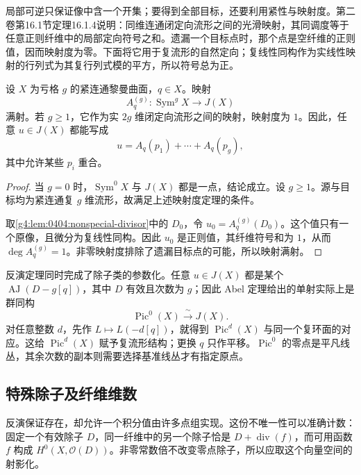 局部可逆只保证像中含一个开集；要得到全部目标，还要利用紧性与映射度。第二卷第16.1节定理16.1.4说明：同维连通闭定向流形之间的光滑映射，其同调度等于任意正则纤维中的局部定向符号之和。遗漏一个目标点时，那个点是空纤维的正则值，因而映射度为零。下面将它用于复流形的自然定向；复线性同构作为实线性映射的行列式为其复行列式模的平方，所以符号总为正。

\begin{theorem}[Jacobi 反演]
	\label{g4:thm:0404:jacobi-inversion}
	设 \(X\) 为亏格 \(g\) 的紧连通黎曼曲面，\(q\in X\)。映射
	\[
		A_q^{(g)}:\operatorname{Sym}^gX\longrightarrow J(X)
	\]
	满射。若 \(g\ge1\)，它作为实 \(2g\) 维闭定向流形之间的映射，映射度为 \(1\)。因此，任意 \(u\in J(X)\) 都能写成
	\[
		u=A_q(p_1)+\cdots+A_q(p_g),
	\]
	其中允许某些 \(p_i\) 重合。
\end{theorem}
\begin{proof}
	当 \(g=0\) 时，\(\operatorname{Sym}^0X\) 与 \(J(X)\) 都是一点，结论成立。设 \(g\ge1\)。源与目标均为紧连通复 \(g\) 维流形，故满足上述映射度定理的条件。

	取\cref{g4:lem:0404:nonspecial-divisor}中的 \(D_0\)，令 \(u_0=A_q^{(g)}(D_0)\)。这个值只有一个原像，且微分为复线性同构。因此 \(u_0\) 是正则值，其纤维符号和为 \(1\)，从而 \(\deg A_q^{(g)}=1\)。非零映射度排除了遗漏目标点的可能，所以映射满射。
\end{proof}

反演定理同时完成了除子类的参数化。任意 \(u\in J(X)\) 都是某个 \(\operatorname{AJ}(D-g[q])\)，其中 \(D\) 有效且次数为 \(g\)；因此 Abel 定理给出的单射实际上是群同构
\begin{equation}
	\label{g4:eq:0404:picard-jacobian}
	\operatorname{Pic}^0(X)\xrightarrow{\ \sim\ }J(X).
\end{equation}
对任意整数 \(d\)，先作 \(L\mapsto L(-d[q])\)，就得到 \(\operatorname{Pic}^d(X)\) 与同一个复环面的对应。这给 \(\operatorname{Pic}^d(X)\) 赋予复流形结构；更换 \(q\) 只作平移。\(\operatorname{Pic}^0\) 的零点是平凡线丛，其余次数的副本则需要选择基准线丛才有指定原点。

\subsection{特殊除子及纤维维数}
\label{g4:subsec:0404:02}

反演保证存在，却允许一个积分值由许多点组实现。这份不唯一性可以准确计数：固定一个有效除子 \(D\)，同一纤维中的另一个除子恰是 \(D+\operatorname{div}(f)\)，而可用函数 \(f\) 构成 \(H^0(X,\mathcal O(D))\)。非零常数倍不改变零点除子，所以应取这个向量空间的射影化。

